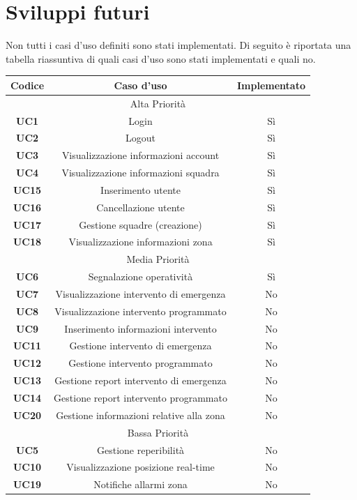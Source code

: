 \section{Sviluppi futuri}
Non tutti i casi d'uso definiti sono stati implementati. Di seguito è riportata una tabella riassuntiva di quali casi d'uso sono stati implementati e quali no.

\begin{center}
	\begin{tabular}{|c|c|c|}
		\hline
		\textbf{Codice} & \textbf{Caso d'uso} & \textbf{Implementato} \\ \hline
		\multicolumn{3}{|c|}{Alta Priorità} \\ \hline
		\textbf{UC1} & Login & Sì\\ \hline
		\textbf{UC2} & Logout & Sì \\ \hline
		\textbf{UC3} & Visualizzazione informazioni account & Sì \\ \hline
		\textbf{UC4} & Visualizzazione informazioni squadra & Sì \\ \hline
		\textbf{UC15} & Inserimento utente & Sì \\ \hline
		\textbf{UC16} & Cancellazione utente & Sì\\ \hline
		\textbf{UC17} & Gestione squadre (creazione) & Sì \\ \hline
		\textbf{UC18} & Visualizzazione informazioni zona & Sì \\ \hline
		\multicolumn{3}{|c|}{Media Priorità} \\ \hline
		\textbf{UC6} & Segnalazione operatività & Sì\\ \hline
		\textbf{UC7} & Visualizzazione intervento di emergenza & No \\ \hline
		\textbf{UC8} & Visualizzazione intervento programmato & No \\ \hline
		\textbf{UC9} & Inserimento informazioni intervento & No \\ \hline
		\textbf{UC11} & Gestione intervento di emergenza & No \\ \hline
		\textbf{UC12} & Gestione intervento programmato & No \\ \hline
		\textbf{UC13} & Gestione report intervento di emergenza & No \\ \hline
		\textbf{UC14} & Gestione report intervento programmato & No \\ \hline
		\textbf{UC20} & Gestione informazioni relative alla zona & No \\ \hline
		\multicolumn{3}{|c|}{Bassa Priorità} \\ \hline
		\textbf{UC5} & Gestione reperibilità & No\\ \hline
		\textbf{UC10} & Visualizzazione posizione real-time & No\\ \hline
		\textbf{UC19} & Notifiche allarmi zona & No\\ \hline
	\end{tabular}
\end{center}
 
